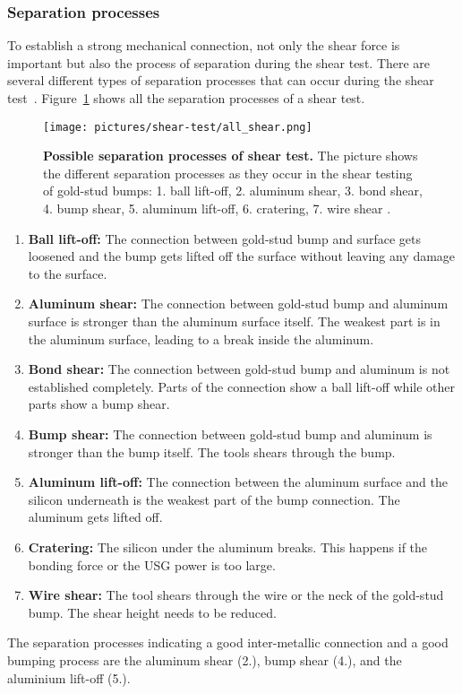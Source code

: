 \subsubsection{Separation processes}\label{sec:shear_separation}
To establish a strong mechanical connection, not only the shear force is important but also the process of separation during the shear test. There are several different types of separation processes that can occur during the shear test~\cite{Sma14b}. Figure~\ref{pic:shear_separations} shows all the separation processes of a shear test.
\begin{figure}
\begin{center}
\texttt{[image: pictures/shear-test/all\_shear.png]}
\end{center}
\caption[Possible separation processes of shear test]{\textbf{Possible separation processes of shear test.} The picture shows the different separation processes as they occur in the shear testing of gold-stud bumps: 1. ball lift-off, 2. aluminum shear, 3. bond shear, 4. bump shear, 5. aluminum lift-off, 6. cratering, 7. wire shear \cite{Sma14b}.}\label{pic:shear_separations}
\end{figure}
\begin{enumerate}
\item \textbf{Ball lift-off:} The connection between gold-stud bump and surface gets loosened and the bump gets lifted off the surface without leaving any damage to the surface.
\item \textbf{Aluminum shear:} The connection between gold-stud bump and aluminum surface is stronger than the aluminum surface itself. The weakest part is in the aluminum surface, leading to a break inside the aluminum.
\item \textbf{Bond shear:} The connection between gold-stud bump and aluminum is not established completely. Parts of the connection show a ball lift-off while other parts show a bump shear.
\item \textbf{Bump shear:} The connection between gold-stud bump and aluminum is stronger than the bump itself. The tools shears through the bump.
\item \textbf{Aluminum lift-off:} The connection between the aluminum surface and the silicon underneath is the weakest part of the bump connection. The aluminum gets lifted off.
\item \textbf{Cratering:} The silicon under the aluminum breaks. This happens if the bonding force or the \ac{USG} power is too large.
\item \textbf{Wire shear:} The tool shears through the wire or the neck of the gold-stud bump. The shear height needs to be reduced.
\end{enumerate}
The separation processes indicating a good inter-metallic connection and a good bumping process are the aluminum shear (2.), bump shear (4.), and the aluminium lift-off (5.).

